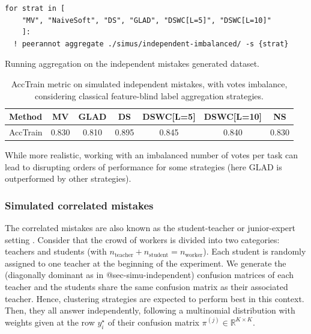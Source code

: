 \begin{listing}[H]
    \begin{verbatim}
for strat in [
    "MV", "NaiveSoft", "DS", "GLAD", "DSWC[L=5]", "DSWC[L=10]"
    ]:
  ! peerannot aggregate ./simus/independent-imbalanced/ -s {strat}
    \end{verbatim}
    \caption{Running aggregation on the independent mistakes generated dataset.}
    \label{lst:indep_mistakes_agg_imbalance}
\end{listing}

\begin{table}[htbp]
    \centering
    \caption{AccTrain metric on simulated independent mistakes, with votes imbalance, considering classical feature-blind label aggregation strategies.}
    \label{tab:accuracy_train_indep}
    \begin{tabular}{|l|c|c|c|c|c|c|}
    \hline
    \textbf{Method} & \textbf{MV} & \textbf{GLAD} & \textbf{DS} & \textbf{DSWC[L=5]} & \textbf{DSWC[L=10]} & \textbf{NS} \\
    \hline
    AccTrain & 0.830 &	0.810 &	0.895 	&0.845& 	0.840 &	0.830\\
    \hline
    \end{tabular}
    \end{table}

While more realistic, working with an imbalanced number of votes per task can lead to disrupting orders of performance for some strategies (here GLAD is outperformed by other strategies).

\subsubsection{Simulated correlated mistakes}
The correlated mistakes are also known as the student-teacher or junior-expert setting \citep{maxmig}. Consider that the crowd of workers is divided into two categories: teachers and students (with $n_{\text{teacher}} + n_{\text{student}}=n_{\text{worker}}$). Each student is randomly assigned to one teacher at the beginning of the experiment. We generate the (diagonally dominant as in @sec-simu-independent) confusion matrices of each teacher and the students share the same confusion matrix as their associated teacher. Hence, clustering strategies are expected to perform best in this context. Then, they all answer independently, following a multinomial distribution with weights given at the row $y_i^\star$ of their confusion matrix $\pi^{(j)}\in\mathbb{R}^{K\times K}$.

